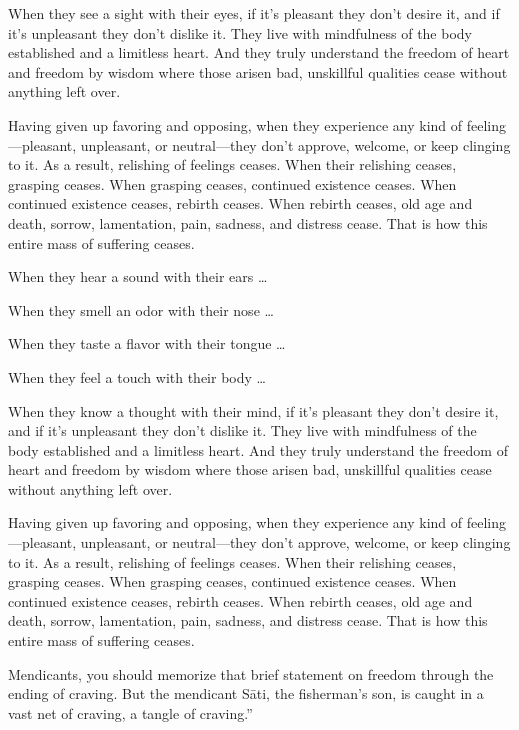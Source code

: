 \documentclass[12pt,openany]{book}%
\begin{document}
When they see a sight with their eyes, if it’s pleasant they don’t desire it, and if it’s unpleasant they don’t dislike it. They live with mindfulness of the body established and a limitless heart. And they truly understand the freedom of heart and freedom by wisdom where those arisen bad, unskillful qualities cease without anything left over. 

Having given up favoring and opposing, when they experience any kind of feeling—pleasant, unpleasant, or neutral—they don’t approve, welcome, or keep clinging to it. As a result, relishing of feelings ceases. When their relishing ceases, grasping ceases. When grasping ceases, continued existence ceases. When continued existence ceases, rebirth ceases. When rebirth ceases, old age and death, sorrow, lamentation, pain, sadness, and distress cease. That is how this entire mass of suffering ceases. 

When they hear a sound with their ears … 

When they smell an odor with their nose … 

When they taste a flavor with their tongue … 

When they feel a touch with their body … 

When they know a thought with their mind, if it’s pleasant they don’t desire it, and if it’s unpleasant they don’t dislike it. They live with mindfulness of the body established and a limitless heart. And they truly understand the freedom of heart and freedom by wisdom where those arisen bad, unskillful qualities cease without anything left over. 

Having given up favoring and opposing, when they experience any kind of feeling—pleasant, unpleasant, or neutral—they don’t approve, welcome, or keep clinging to it. As a result, relishing of feelings ceases. When their relishing ceases, grasping ceases. When grasping ceases, continued existence ceases. When continued existence ceases, rebirth ceases. When rebirth ceases, old age and death, sorrow, lamentation, pain, sadness, and distress cease. That is how this entire mass of suffering ceases. 

Mendicants, you should memorize that brief statement on freedom through the ending of craving. But the mendicant \textsanskrit{Sāti}, the fisherman’s son, is caught in a vast net of craving, a tangle of craving.” 
\end{document}
